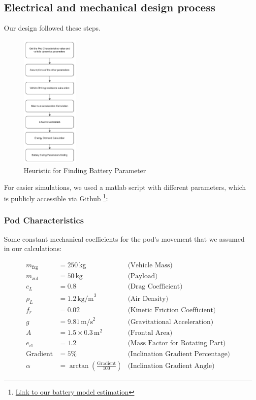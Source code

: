 \subsection{Electrical and mechanical design process}
Our design followed these steps.\\
\begin{figure}
    \centering
    \includegraphics[width=0.25\textwidth]{texfiles/elec/eimg/BatteryDesignProcess}
    \caption{Heuristic for Finding Battery Parameter}
\end{figure}
For easier simulations, we used a matlab script with different parameters, which is publicly accessible via Github \footnote{\href{https://github.com/Team-Tachyon-e-V/battery_model}{Link to our battery model estimation}}:
\subsubsection*{Pod Characteristics} 
Some constant mechanical coefficients for the pod's movement that we assumed in our calculations:

\begin{align*}
m_{\text{fzg}} &= 250 \, \text{kg} & \text{(Vehicle Mass)} \\
m_{\text{zul}} &= 50 \, \text{kg} & \text{(Payload)} \\
c_L &= 0.8 & \text{(Drag Coefficient)} \\
\rho_L &= 1.2 \, \text{kg/m}^3 & \text{(Air Density)} \\
f_r &= 0.02 & \text{(Kinetic Friction Coefficient)} \\
g &= 9.81 \, \text{m/s}^2 & \text{(Gravitational Acceleration)} \\
A &= 1.5 \times 0.3 \, \text{m}^2 & \text{(Frontal Area)} \\
e_{i1} &= 1.2 & \text{(Mass Factor for Rotating Part)} \\
\text{Gradient} &= 5\% & \text{(Inclination Gradient Percentage)} \\
\alpha &= \arctan\left(\frac{\text{Gradient}}{100}\right) & \text{(Inclination Gradient Angle)}
\end{align*}

